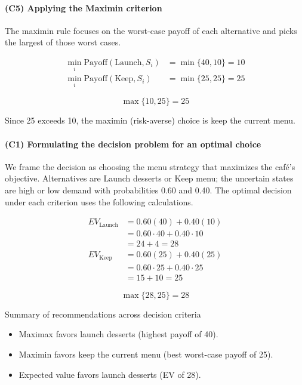 \paragraph{(C5) Applying the Maximin criterion}\label{subsubsec:practice-activity-1-solution-1-c5}

The maximin rule focuses on the worst-case payoff of each alternative and picks the largest of those worst cases.

\[
\begin{aligned}
\min_i \text{Payoff}(\text{Launch}, S_i) &= \min\{40, 10\} = 10\\
\min_i \text{Payoff}(\text{Keep}, S_i) &= \min\{25, 25\} = 25
\end{aligned}
\]

\[
\max\{10, 25\} = 25
\]

Since 25 exceeds 10, the maximin (risk-averse) choice is keep the current menu.

\paragraph{(C1) Formulating the decision problem for an optimal choice}\label{subsubsec:practice-activity-1-solution-1-c1}

We frame the decision as choosing the menu strategy that maximizes the café's objective. Alternatives are
Launch desserts or Keep menu; the uncertain states are high or low demand with
probabilities 0.60 and 0.40. The optimal decision under each criterion uses the following calculations.

\[
\begin{aligned}
EV_{\text{Launch}} &= 0.60(40) + 0.40(10) \\
&= 0.60\cdot40 + 0.40\cdot10 \\
&= 24 + 4 = 28 \\
EV_{\text{Keep}} &= 0.60(25) + 0.40(25) \\
&= 0.60\cdot25 + 0.40\cdot25 \\
&= 15 + 10 = 25
\end{aligned}
\]

\[
\max\{28, 25\} = 28
\]

Summary of recommendations across decision criteria

\begin{itemize}
	\item Maximax favors launch desserts (highest payoff of 40).
	\item Maximin favors keep the current menu (best worst-case payoff of 25).
	\item Expected value favors launch desserts (EV of 28).
\end{itemize}

